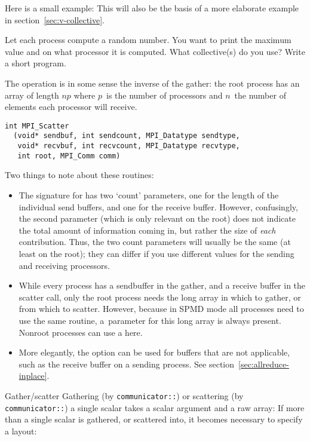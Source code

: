 Here is a small example:
This will also be the basis of a more elaborate example in
section~\ref{sec:v-collective}.

\begin{exercise}
  \label{ex:randomwhere}
  Let each process compute a random number.
  You want to print the maximum value and on what processor it
  is computed. What collective(s) do you use? Write a short program.
\end{exercise}

The  operation is in some sense the inverse of the gather:
the root process has an array of length $np$ where $p$~is the number of processors
and $n$~the number of elements each processor will receive.
\begin{lstlisting}
int MPI_Scatter
  (void* sendbuf, int sendcount, MPI_Datatype sendtype, 
   void* recvbuf, int recvcount, MPI_Datatype recvtype, 
   int root, MPI_Comm comm) 
\end{lstlisting}

Two things to note about these routines:
\begin{itemize}
\item The signature for  has two `count' parameters, one
  for the length of the individual send buffers, and one for the receive buffer.
  However, confusingly, the second parameter (which is only relevant on the root)
  does not indicate the total amount of information coming in, but
  rather the size of \emph{each} contribution. Thus, the two count parameters
  will usually be the same (at least on the root); they can differ if you 
  use different  values for the sending and receiving
  processors.
\item While every process has a sendbuffer in the gather, and a receive buffer
  in the scatter call, only the root process needs the long array in which to gather,
  or from which to scatter.
  However, because in \ac{SPMD} mode all processes need to use the same routine,
  a~parameter for this long array is always present. Nonroot processes can use
  a  here.
\item More elegantly, the  option can be
  used for buffers that are not applicable, such as the receive buffer on a sending process.
  See section~\ref{sec:allreduce-inplace}.
\end{itemize}

\begin{mplnote}{Gather/scatter}
  Gathering (by \lstinline+communicator::+)
  or scattering (by \lstinline+communicator::+)
  a single scalar takes a scalar argument
  and a raw array:
  If more than a single scalar is gathered, or scattered into,
  it becomes necessary to specify a layout:
\end{mplnote}

